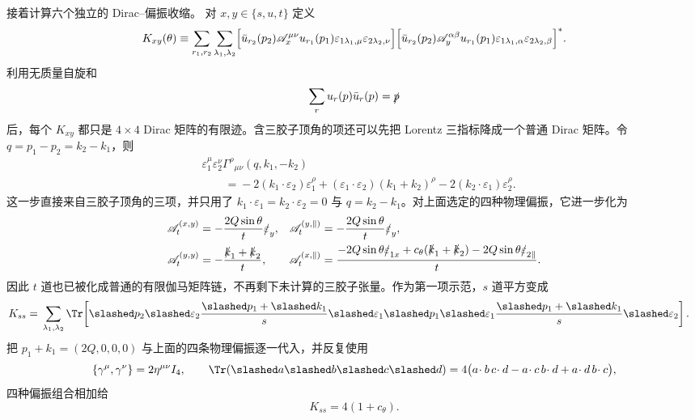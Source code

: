 \begin{derivation}[夸克与胶子散射的通道求和]
接着计算六个独立的 Dirac--偏振收缩。
对 $x,y\in\{s,u,t\}$ 定义
\begin{equation*}
 K_{xy}(\theta)
 \equiv
 \sum_{r_1,r_2}
 \sum_{\lambda_1,\lambda_2}
 \Bigl[
 \bar u_{r_2}(p_2)\mathscr A_x^{\mu\nu}u_{r_1}(p_1)
 \varepsilon_{1\lambda_1,\mu}
 \varepsilon_{2\lambda_2,\nu}
 \Bigr]
 \Bigl[
 \bar u_{r_2}(p_2)\mathscr A_y^{\alpha\beta}u_{r_1}(p_1)
 \varepsilon_{1\lambda_1,\alpha}
 \varepsilon_{2\lambda_2,\beta}
 \Bigr]^* .
\end{equation*}
利用无质量自旋和
\begin{equation*}
 \sum_r u_r(p)\bar u_r(p)=\slashed p
\end{equation*}
后，每个 $K_{xy}$ 都只是 $4\times4$ Dirac 矩阵的有限迹。含三胶子顶角的项还可以先把 Lorentz 三指标降成一个普通 Dirac 矩阵。令 $q=p_1-p_2=k_2-k_1$，则
\begin{align*}
 &\varepsilon_1^\mu\varepsilon_2^\nu
 \Gamma^{\rho}{}_{\mu\nu}(q,k_1,-k_2)\\
 &\qquad={}
 -2(k_1\!\cdot\varepsilon_2)\varepsilon_1^\rho
 +(\varepsilon_1\!\cdot\varepsilon_2)(k_1+k_2)^\rho
 -2(k_2\!\cdot\varepsilon_1)\varepsilon_2^\rho.
\end{align*}
这一步直接来自三胶子顶角的三项，并只用了
$k_1\cdot\varepsilon_1=k_2\cdot\varepsilon_2=0$ 与 $q=k_2-k_1$。对上面选定的四种物理偏振，它进一步化为
\begin{align*}
 \mathscr A_t^{(x,y)}
 &=-\frac{2Q\sin\theta}{t}\slashed\varepsilon_y,
 &
 \mathscr A_t^{(y,\parallel)}
 &=-\frac{2Q\sin\theta}{t}\slashed\varepsilon_y,\\
 \mathscr A_t^{(y,y)}
 &=-\frac{\slashed k_1+\slashed k_2}{t},
 &
 \mathscr A_t^{(x,\parallel)}
 &=\frac{-2Q\sin\theta\slashed\varepsilon_{1x}
 +c_\theta(\slashed k_1+\slashed k_2)
 -2Q\sin\theta\slashed\varepsilon_{2\parallel}}{t}.
\end{align*}
因此 $t$ 道也已被化成普通的有限伽马矩阵链，不再剩下未计算的三胶子张量。作为第一项示范，$s$ 道平方变成
\begin{align*}
 K_{ss}
 ={}&\sum_{\lambda_1,\lambda_2}
 \Tr\!\left[
 \slashed p_2
 \slashed\varepsilon_2
 \frac{\slashed p_1+\slashed k_1}{s}
 \slashed\varepsilon_1
 \slashed p_1
 \slashed\varepsilon_1
 \frac{\slashed p_1+\slashed k_1}{s}
 \slashed\varepsilon_2
 \right].
\end{align*}
把 $p_1+k_1=(2Q,0,0,0)$ 与上面的四条物理偏振逐一代入，并反复使用
\begin{equation*}
 \{\gamma^\mu,\gamma^\nu\}=2\eta^{\mu\nu}I_4,
 \qquad
 \Tr(\slashed a\slashed b\slashed c\slashed d)
 =4\bigl(a\!\cdot b\,c\!\cdot d-a\!\cdot c\,b\!\cdot d+a\!\cdot d\,b\!\cdot c\bigr),
\end{equation*}
四种偏振组合相加给
\begin{equation*}
 K_{ss}=4(1+c_\theta).
\end{equation*}


\end{derivation}
